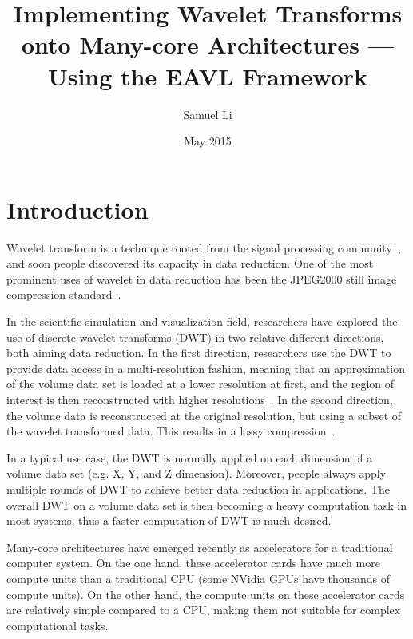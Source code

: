 \documentclass{article}
\title{Implementing Wavelet Transforms onto Many-core Architectures ---
        Using the EAVL Framework}
\author{Samuel Li}
\date{May 2015}
\begin{document}
\maketitle


\section{Introduction}
\label{sec:intro}
%
Wavelet transform is a technique rooted from the signal processing 
community~\cite{daubechies1990wavelet, mallat1999wavelet},
and soon people discovered its capacity in data reduction.
%
One of the most prominent uses of wavelet in data reduction has been
the JPEG2000 still image compression
standard~\cite{adams2001jpeg,usevitch2001tutorial}. 

In the scientific simulation and visualization field, researchers have
explored the use of discrete wavelet transforms (DWT) in two 
relative different directions, both aiming data reduction.
%
In the first direction, researchers use the DWT to provide data access
in a multi-resolution fashion, meaning that an approximation of the volume data
set is loaded at a lower resolution at first, and the region of interest
is then reconstructed with higher resolutions~\cite{mallat1989theory,
kanai1998digital, baldwin2003multi}.
%
In the second direction, the volume data is reconstructed at the 
original resolution, but using a subset of the wavelet transformed 
data.
%
This results in a lossy compression~\cite{bethel2012high,
norton2012vapor}.

In a typical use case, the DWT is normally applied on each dimension of a
volume data set (e.g. X, Y, and Z dimension). 
%
Moreover, people always apply multiple rounds of DWT to achieve better
data reduction in applications.
%
The overall DWT on a volume data set is then becoming a heavy computation
task in most systems, thus a faster computation of DWT is much desired. 

Many-core architectures have emerged recently as accelerators for a 
traditional computer system.
%
On the one hand, these accelerator cards have much more compute units 
than a traditional CPU (some NVidia GPUs have thousands of compute units).
%
On the other hand, the compute units on these accelerator cards are 
relatively simple compared to a CPU, making them not suitable for complex 
computational tasks.
\end{document}
